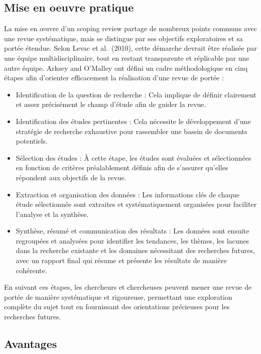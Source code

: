 \documentclass[
  letterpaper,
  DIV=11,
  numbers=noendperiod]{scrreprt}
\begin{document}
\subsection{Mise en oeuvre pratique}\label{mise-en-oeuvre-pratique}

La mise en œuvre d'un scoping review partage de nombreux points communs
avec une revue systématique, mais se distingue par ses objectifs
exploratoires et sa portée étendue. Selon Levac et al.~(2010), cette
démarche devrait être réalisée par une équipe multidisciplinaire, tout
en restant transparente et réplicable par une autre équipe. Arksey and
O'Malley ont défini un cadre méthodologique en cinq étapes afin
d'orienter efficacement la réalisation d'une revue de portée :

\begin{itemize}
\item
  Identification de la question de recherche : Cela implique de définir
  clairement et assez précisément le champ d'étude afin de guider la
  revue.
\item
  Identification des études pertinentes : Cela nécessite le
  développement d'une stratégie de recherche exhaustive pour rassembler
  une bassin de documents potentiels.
\item
  Sélection des études : À cette étape, les études sont évaluées et
  sélectionnées en fonction de critères préalablement définis afin de
  s'assurer qu'elles répondent aux objectifs de la revue.
\item
  Extraction et organisation des données : Les informations clés de
  chaque étude sélectionnée sont extraites et systématiquement
  organisées pour faciliter l'analyse et la synthèse.
\item
  Synthèse, résumé et communication des résultats : Les données sont
  ensuite regroupées et analysées pour identifier les tendances, les
  thèmes, les lacunes dans la recherche existante et les domaines
  nécessitant des recherches futures, avec un rapport final qui résume
  et présente les résultats de manière cohérente.
\end{itemize}

En suivant ces étapes, les chercheurs et chercheuses peuvent mener une
revue de portée de manière systématique et rigoureuse, permettant une
exploration complète du sujet tout en fournissant des orientations
précieuses pour les recherches futures.

\subsection{Avantages}\label{avantages-2}
\end{document}
